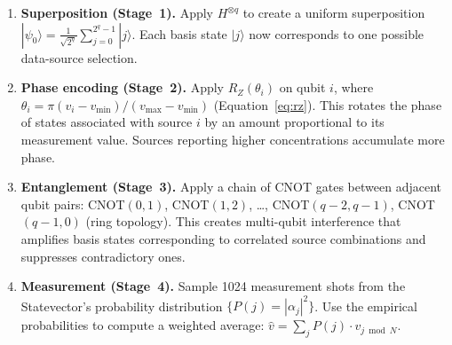 \documentclass[12pt,a4paper]{article}
\newcommand{\ket}[1]{|#1\rangle}
\begin{document}
\begin{enumerate}
\item \textbf{Superposition (Stage~1).}
      Apply $H^{\otimes q}$ to create a uniform superposition
      $\ket{\psi_0} = \frac{1}{\sqrt{2^q}}\sum_{j=0}^{2^q-1}\ket{j}$.
      Each basis state $\ket{j}$ now corresponds to one possible data-source
      selection.

\item \textbf{Phase encoding (Stage~2).}
      Apply $R_Z(\theta_i)$ on qubit $i$, where
      $\theta_i = \pi (v_i - v_{\min})/(v_{\max} - v_{\min})$
      (Equation~\ref{eq:rz}). This rotates the phase of states associated
      with source $i$ by an amount proportional to its measurement value.
      Sources reporting higher concentrations accumulate more phase.

\item \textbf{Entanglement (Stage~3).}
      Apply a chain of CNOT gates between adjacent qubit pairs:
      CNOT$(0,1)$, CNOT$(1,2)$, \ldots, CNOT$(q-2, q-1)$,
      CNOT$(q-1, 0)$ (ring topology). This creates multi-qubit interference
      that amplifies basis states corresponding to correlated source
      combinations and suppresses contradictory ones.

\item \textbf{Measurement (Stage~4).}
      Sample 1024 measurement shots from the Statevector's probability
      distribution $\{P(j) = |\alpha_j|^2\}$. Use the empirical probabilities
      to compute a weighted average:
      $\hat{v} = \sum_j P(j) \cdot v_{j \bmod N}$.
\end{enumerate}
\end{document}
